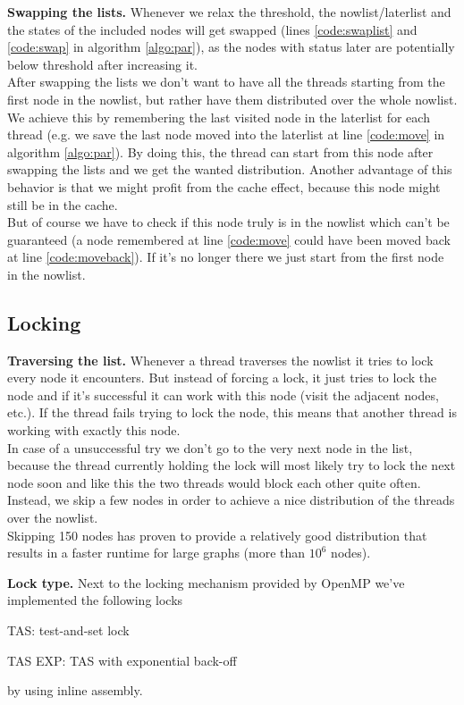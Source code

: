 \documentclass[letterpaper]{article}
\newcommand{\mypar}[1]{{\bf #1.}}
\begin{document}
\mypar{Swapping the lists}
Whenever we relax the threshold, the nowlist/laterlist and the states of the included nodes will get swapped (lines \ref{code:swaplist} and \ref{code:swap} in algorithm \ref{algo:par}), as the nodes with status later are potentially below threshold after increasing it.\\
After swapping the lists  we don't want to have all the threads starting from the first node in the nowlist, but rather have them distributed over the whole nowlist. We achieve this by remembering the last visited node in the laterlist for each thread (e.g. we save the last node moved into the laterlist at line \ref{code:move} in algorithm \ref{algo:par}). By doing this, the thread can start from this node after swapping the lists and we get the wanted distribution. Another advantage of this behavior is that we might profit from the cache effect, because this node might still be in the cache.\\
But of course we have to check if this node truly is in the nowlist which can't be guaranteed (a node remembered at line \ref{code:move} could have been moved back at line \ref{code:moveback}). If it's no longer there we just start from the first node in the nowlist.

\subsection{Locking}\label{ssec:lock}

\mypar{Traversing the list}
Whenever a thread traverses the nowlist it tries to lock every node it encounters. But instead of forcing a lock, it just tries to lock the node and if it's successful it can work with this node (visit the adjacent nodes, etc.). If the thread fails trying to lock the node, this means that another thread is working with exactly this node.\\
In case of a unsuccessful try we don't go to the very next node in the list, because the thread currently holding the lock will most likely try to lock the next node soon and like this the two threads would block each other quite often. Instead, we skip a few nodes in order to achieve a nice distribution of the threads over the nowlist.\\
Skipping 150 nodes has proven to provide a relatively good distribution that results in a faster runtime for large graphs (more than $10^6$ nodes).

\mypar{Lock type}
Next to the locking mechanism provided by OpenMP we've implemented the following locks
\begin{compactitem}
\item TAS: test-and-set lock
\item TAS EXP: TAS with exponential back-off
\end{compactitem}
by using inline assembly.
\end{document}
